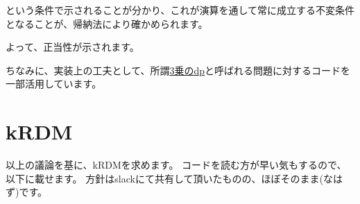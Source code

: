 \documentclass[a4paper, 10pt, dvipdfmx]{jlreq}
\begin{document}
という条件で示されることが分かり、これが演算を通して常に成立する不変条件となることが、帰納法により確かめられます。

よって、正当性が示されます。

ちなみに、実装上の工夫として、所謂\href{https://qiita.com/drken/items/7c6ff2aa4d8fce1c9361#7-%E4%B8%8E%E3%81%88%E3%82%89%E3%82%8C%E3%81%9F%E9%83%A8%E5%88%86%E9%9B%86%E5%90%88%E3%81%AE%E9%83%A8%E5%88%86%E9%9B%86%E5%90%88%E3%82%92%E5%88%97%E6%8C%99}{3乗のdp}と呼ばれる問題に対するコードを一部活用しています。

\section{kRDM}

以上の議論を基に、kRDMを求めます。
コードを読む方が早い気もするので、以下に載せます。
方針はslackにて共有して頂いたものの、ほぼそのまま(なはず)です。
\end{document}
